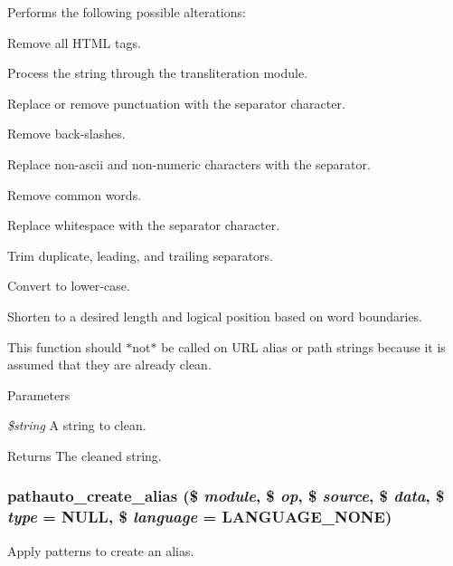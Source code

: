 Performs the following possible alterations:
\begin{DoxyItemize}
\item Remove all HTML tags.
\item Process the string through the transliteration module.
\item Replace or remove punctuation with the separator character.
\item Remove back-\/slashes.
\item Replace non-\/ascii and non-\/numeric characters with the separator.
\item Remove common words.
\item Replace whitespace with the separator character.
\item Trim duplicate, leading, and trailing separators.
\item Convert to lower-\/case.
\item Shorten to a desired length and logical position based on word boundaries.
\end{DoxyItemize}

This function should $\ast$not$\ast$ be called on URL alias or path strings because it is assumed that they are already clean.


\begin{DoxyParams}{Parameters}
\item[{\em \$string}]A string to clean. \end{DoxyParams}
\begin{DoxyReturn}{Returns}
The cleaned string. 
\end{DoxyReturn}
\hypertarget{pathauto_8inc_a7b68bec532634de11616779796a1fb7f}{
\subsubsection[{pathauto\_\-create\_\-alias}]{\setlength{\rightskip}{0pt plus 5cm}pathauto\_\-create\_\-alias (\$ {\em module}, \/  \$ {\em op}, \/  \$ {\em source}, \/  \$ {\em data}, \/  \$ {\em type} = {\ttfamily NULL}, \/  \$ {\em language} = {\ttfamily LANGUAGE\_\-NONE})}}
\label{pathauto_8inc_a7b68bec532634de11616779796a1fb7f}
Apply patterns to create an alias.


